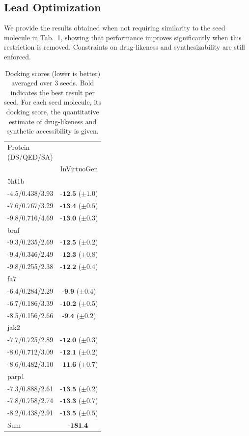 \documentclass{article} %
\begin{document}
\subsection{Lead Optimization}\label{app:lead}
We provide the results obtained when not requiring similarity to the seed molecule in Tab.~\ref{tab:docking_no_sim}, showing that performance improves significantly when this restriction is removed. Constraints on drug-likeness and synthesizability are still enforced.
\begin{table}[ht]
\centering
\small
\caption{Docking scores (lower is better) averaged over 3 seeds. Bold indicates the best result per seed. For each seed molecule, its docking score, the quantitative estimate of drug-likeness and synthetic accessibility is given.}
\label{tab:docking_no_sim}
\begingroup
\setlength\tabcolsep{4pt}
\begin{tabularx}{0.2\linewidth}{@{}l | >{\columncolor{gray!20}}c @{}}
\toprule
\shortstack{Protein \\ \tiny{(DS/QED/SA)}} & \multicolumn{1}{c}{No sim} \\
\cmidrule(lr){2-2}
 & InVirtuoGen \\
\midrule
5ht1b &  \\
\tiny{-4.5/0.438/3.93} & $\textbf{-12.5}$ {\tiny ($\pm 1.0$)} \\
\tiny{-7.6/0.767/3.29} & $\textbf{-13.4}$ {\tiny ($\pm 0.5$)} \\
\tiny{-9.8/0.716/4.69} & $\textbf{-13.0}$ {\tiny ($\pm 0.3$)} \\
braf &  \\
\tiny{-9.3/0.235/2.69} & $\textbf{-12.5}$ {\tiny ($\pm 0.2$)} \\
\tiny{-9.4/0.346/2.49} & $\textbf{-12.3}$ {\tiny ($\pm 0.8$)} \\
\tiny{-9.8/0.255/2.38} & $\textbf{-12.2}$ {\tiny ($\pm 0.4$)} \\
fa7 &  \\
\tiny{-6.4/0.284/2.29} & $\textbf{-9.9}$ {\tiny ($\pm 0.4$)} \\
\tiny{-6.7/0.186/3.39} & $\textbf{-10.2}$ {\tiny ($\pm 0.5$)} \\
\tiny{-8.5/0.156/2.66} & $\textbf{-9.4}$ {\tiny ($\pm 0.2$)} \\
jak2 &  \\
\tiny{-7.7/0.725/2.89} & $\textbf{-12.0}$ {\tiny ($\pm 0.3$)} \\
\tiny{-8.0/0.712/3.09} & $\textbf{-12.1}$ {\tiny ($\pm 0.2$)} \\
\tiny{-8.6/0.482/3.10} & $\textbf{-11.6}$ {\tiny ($\pm 0.7$)} \\
parp1 &  \\
\tiny{-7.3/0.888/2.61} & $\textbf{-13.5}$ {\tiny ($\pm 0.2$)} \\
\tiny{-7.8/0.758/2.74} & $\textbf{-13.3}$ {\tiny ($\pm 0.7$)} \\
\tiny{-8.2/0.438/2.91} & $\textbf{-13.5}$ {\tiny ($\pm 0.5$)} \\
\midrule
\multicolumn{1}{l}{Sum} & $\textbf{-181.4 }$ \\
\bottomrule
\end{tabularx}
\endgroup
\end{table}
\clearpage
\end{document}
